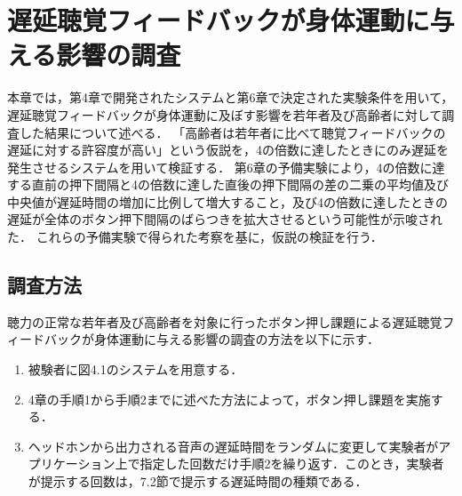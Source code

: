 \chapter{遅延聴覚フィードバックが身体運動に与える影響の調査}
本章では，第4章で開発されたシステムと第6章で決定された実験条件を用いて，遅延聴覚フィードバックが身体運動に及ぼす影響を若年者及び高齢者に対して調査した結果について述べる．
「高齢者は若年者に比べて聴覚フィードバックの遅延に対する許容度が高い」という仮説を，4の倍数に達したときにのみ遅延を発生させるシステムを用いて検証する．
第6章の予備実験により，4の倍数に達する直前の押下間隔と4の倍数に達した直後の押下間隔の差の二乗の平均値及び中央値が遅延時間の増加に比例して増大すること，及び4の倍数に達したときの遅延が全体のボタン押下間隔のばらつきを拡大させるという可能性が示唆された．
これらの予備実験で得られた考察を基に，仮説の検証を行う．
\section{調査方法}
聴力の正常な若年者及び高齢者を対象に行ったボタン押し課題による遅延聴覚フィードバックが身体運動に与える影響の調査の方法を以下に示す．
\begin{enumerate}
  \item 被験者に図4.1のシステムを用意する．
  \item 4章の手順1から手順2までに述べた方法によって，ボタン押し課題を実施する．
  \item ヘッドホンから出力される音声の遅延時間をランダムに変更して実験者がアプリケーション上で指定した回数だけ手順2を繰り返す．このとき，実験者が提示する回数は，7.2節で提示する遅延時間の種類である．
\end{enumerate}
\newpage
